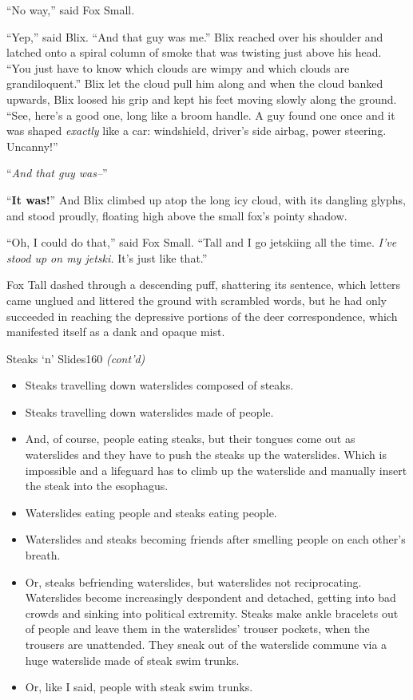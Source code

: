 \documentclass[12pt,twoside]{report}
\begin{document}
``No way,'' said Fox Small.

``Yep,'' said Blix.  ``And that guy was me.''  Blix reached over his
shoulder and latched onto a spiral column of smoke that was twisting
just above his head.  ``You just have to know which clouds are wimpy
and which clouds are grandiloquent.''  Blix let the cloud pull him
along and when the cloud banked upwards, Blix loosed his grip and kept
his feet moving slowly along the ground.  ``See, here's a good one,
long like a broom handle.  A guy found one once and it was shaped {\em
  exactly} like a car: windshield, driver's side airbag, power
steering. Uncanny!''

``{\em And that guy was--}''

``{\bf It was!}''  And Blix climbed up atop the long icy cloud, with
its dangling glyphs, and stood proudly, floating high above the small
fox's pointy shadow.

``Oh, I could do that,'' said Fox Small.  ``Tall and I go jetskiing
all the time.  {\em I've stood up on my jetski.}  It's just like
that.''

Fox Tall dashed through a descending puff, shattering its sentence,
which letters came unglued and littered the ground with scrambled
words, but he had only succeeded in reaching the depressive portions
of the deer correspondence, which manifested itself as a dank and
opaque mist.

	\begin{sidebar}{Steaks `n' Slides}{160}
		\textit{(cont'd)}
		\begin{itemize}
			\item Steaks travelling down waterslides composed of steaks.
			\item Steaks travelling down waterslides made of people.
			\item And, of course, people eating steaks, but their tongues come out as waterslides and they have to push the steaks up the waterslides. Which is impossible and a lifeguard has to climb up the waterslide and manually insert the steak into the esophagus.
			\item Waterslides eating people and steaks eating people.
			\item Waterslides and steaks becoming friends after smelling people on each other's breath.
			\item Or, steaks befriending waterslides, but waterslides not reciprocating. Waterslides become increasingly despondent and detached, getting into bad crowds and sinking into political extremity. Steaks make ankle bracelets out of people and leave them in the waterslides' trouser pockets, when the trousers are unattended. They sneak out of the waterslide commune via a huge waterslide made of steak swim trunks.
			\item Or, like I said, people with steak swim trunks.
		\end{itemize}
	\end{sidebar}
\end{document}
